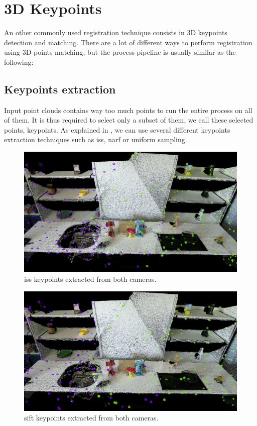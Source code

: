 \section{3D Keypoints}

An other commonly used registration technique consists in 3D keypoints detection and matching. 
There are a lot of different ways to perform registration using 3D points matching, but the process pipeline is usually similar as the following:

\subsection{Keypoints extraction}

    Input point clouds contains way too much points to run the entire process on all of them. It is thus required to select only a subset of them, we call these selected points, keypoints. As explained in \cite{pcl_feat}, we can use several different keypoints extraction techniques such as \acrshort{iss}, \acrshort{narf} or uniform sampling. \\
    
    \begin{figure}[h!]
        \centering
        \includegraphics[width=\textwidth]{images/iss_50.png}
        \caption{\acrshort{iss} keypoints extracted from both cameras.}
        \label{fig:iss_kp}
    \end{figure}
    
    \begin{figure}[h!]
        \centering
        \includegraphics[width=\textwidth]{images/sift_30.png}
        \caption{\acrshort{sift} keypoints extracted from both cameras.}
        \label{fig:sift_kp}
    \end{figure}
    
